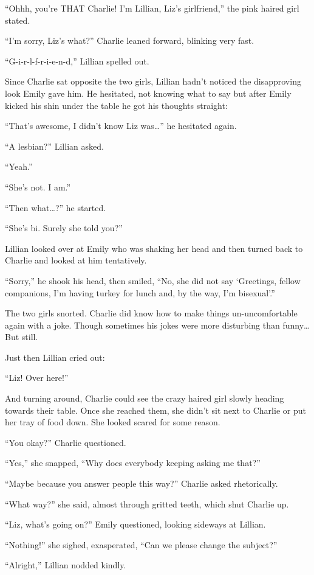 “Ohhh, you're THAT Charlie! I'm Lillian, Liz's girlfriend,” the pink haired girl stated.

“I'm sorry, Liz's what?” Charlie leaned forward, blinking very fast.

“G-i-r-l-f-r-i-e-n-d,” Lillian spelled out.

Since Charlie sat opposite the two girls, Lillian hadn't noticed the disapproving look Emily gave him. He hesitated, not knowing what to say but after Emily kicked his shin under the table he got his thoughts straight:

“That's awesome, I didn't know Liz was…” he hesitated again.

“A lesbian?” Lillian asked.

“Yeah.”

“She's not. I am.”

“Then what…?” he started.

“She's bi. Surely she told you?”

Lillian looked over at Emily who was shaking her head and then turned back to Charlie and looked at him tentatively.

“Sorry,” he shook his head, then smiled, “No, she did not say ‘Greetings, fellow companions, I'm having turkey for lunch and, by the way, I'm bisexual'.”

The two girls snorted. Charlie did know how to make things un-uncomfortable again with a joke. Though sometimes his jokes were more disturbing than funny…  But still.

Just then Lillian cried out:

“Liz! Over here!”

And turning around, Charlie could see the crazy haired girl slowly heading towards their table. Once she reached them, she didn't sit next to Charlie or put her tray of food down. She looked scared for some reason.

“You okay?” Charlie questioned.

“Yes,” she snapped, “Why does everybody keeping asking me that?”

“Maybe because you answer people this way?” Charlie asked rhetorically.

“What way?” she said, almost through gritted teeth, which shut Charlie up.

“Liz, what's going on?” Emily questioned, looking sideways at Lillian.

“Nothing!” she sighed, exasperated, “Can we please change the subject?”

“Alright,” Lillian nodded kindly.

